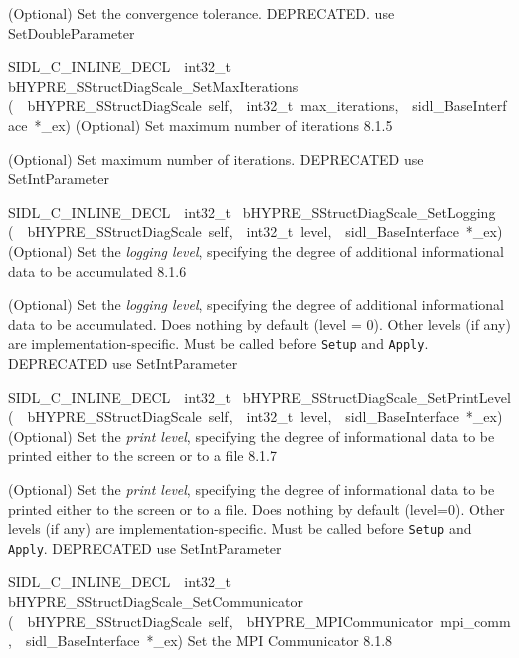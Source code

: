 \documentclass{article}
\begin{document}
\begin{cxxentry}
\begin{cxxentry}
\begin{cxxfunction}
\begin{cxxdoc}
(Optional) Set the convergence tolerance.
DEPRECATED.  use SetDoubleParameter
\end{cxxdoc}
\end{cxxfunction}
\begin{cxxfunction}
{SIDL\_C\_INLINE\_DECL\ \ int32\_t\ }
        {bHYPRE\_SStructDiagScale\_SetMaxIterations}
        {(\ \ bHYPRE\_SStructDiagScale\ self,\ \ int32\_t\ max\_iterations,\ \ sidl\_BaseInterface\ *\_ex)}
        {
(Optional) Set maximum number of iterations}
        {8.1.5}
\begin{cxxdoc}

(Optional) Set maximum number of iterations.
DEPRECATED   use SetIntParameter
\end{cxxdoc}
\end{cxxfunction}
\begin{cxxfunction}
{SIDL\_C\_INLINE\_DECL\ \ int32\_t\ }
        {bHYPRE\_SStructDiagScale\_SetLogging}
        {(\ \ bHYPRE\_SStructDiagScale\ self,\ \ int32\_t\ level,\ \ sidl\_BaseInterface\ *\_ex)}
        {
(Optional) Set the {\it logging level}, specifying the degree
of additional informational data to be accumulated}
        {8.1.6}
\begin{cxxdoc}

(Optional) Set the {\it logging level}, specifying the degree
of additional informational data to be accumulated.  Does
nothing by default (level = 0).  Other levels (if any) are
implementation-specific.  Must be called before {\tt Setup}
and {\tt Apply}.
DEPRECATED   use SetIntParameter
\end{cxxdoc}
\end{cxxfunction}
\begin{cxxfunction}
{SIDL\_C\_INLINE\_DECL\ \ int32\_t\ }
        {bHYPRE\_SStructDiagScale\_SetPrintLevel}
        {(\ \ bHYPRE\_SStructDiagScale\ self,\ \ int32\_t\ level,\ \ sidl\_BaseInterface\ *\_ex)}
        {
(Optional) Set the {\it print level}, specifying the degree
of informational data to be printed either to the screen or
to a file}
        {8.1.7}
\begin{cxxdoc}

(Optional) Set the {\it print level}, specifying the degree
of informational data to be printed either to the screen or
to a file.  Does nothing by default (level=0).  Other levels
(if any) are implementation-specific.  Must be called before
{\tt Setup} and {\tt Apply}.
DEPRECATED   use SetIntParameter
\end{cxxdoc}
\end{cxxfunction}
\begin{cxxfunction}
{SIDL\_C\_INLINE\_DECL\ \ int32\_t\ }
        {bHYPRE\_SStructDiagScale\_SetCommunicator}
        {(\ \ bHYPRE\_SStructDiagScale\ self,\ \ bHYPRE\_MPICommunicator\ mpi\_comm,\ \ sidl\_BaseInterface\ *\_ex)}
        {
Set the MPI Communicator}
        {8.1.8}
\begin{cxxdoc}


\end{cxxdoc}
\end{cxxfunction}
\end{cxxentry}
\end{cxxentry}
\end{document}
